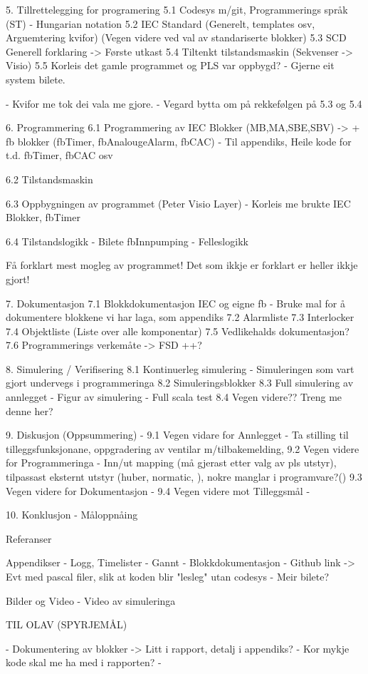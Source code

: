 5. Tillrettelegging for programering
    5.1 Codesys m/git, Programmerings språk (ST) - Hungarian notation
    5.2 IEC Standard (Generelt, templates osv, Arguemtering kvifor) (Vegen videre ved val av standariserte blokker)
    5.3 SCD Generell forklaring -> Første utkast
    5.4 Tiltenkt tilstandsmaskin (Sekvenser -> Visio)
    5.5 Korleis det gamle programmet og PLS var oppbygd?
    - Gjerne eit system bilete.
  
    - Kvifor me tok dei vala me gjore.
    - Vegard bytta om på rekkefølgen på 5.3 og 5.4


6. Programmering
    6.1 Programmering av IEC Blokker (MB,MA,SBE,SBV) -> + fb blokker (fbTimer, fbAnalougeAlarm, fbCAC)
    - Til appendiks, Heile kode for t.d. fbTimer, fbCAC osv
   
    6.2 Tilstandsmaskin

    6.3 Oppbygningen av programmet (Peter Visio Layer)
    - Korleis me brukte IEC Blokker, fbTimer

    6.4 Tilstandslogikk
    - Bilete fbInnpumping
    - Felleslogikk


    Få forklart mest mogleg av programmet!
    Det som ikkje er forklart er heller ikkje gjort!

7. Dokumentasjon
    7.1 Blokkdokumentasjon IEC og eigne fb
    - Bruke mal for å dokumentere blokkene vi har laga, som appendiks
    7.2 Alarmliste
    7.3 Interlocker
    7.4 Objektliste (Liste over alle komponentar)
    7.5 Vedlikehalds dokumentasjon? 
    7.6 Programmerings verkemåte -> FSD
    ++?


8. Simulering / Verifisering
    8.1 Kontinuerleg simulering
    - Simuleringen som vart gjort undervegs i programmeringa
    8.2 Simuleringsblokker
    8.3 Full simulering av annlegget
    - Figur av simulering
    - Full scala test
    8.4 Vegen videre?? Treng me denne her?

9. Diskusjon (Oppsummering)             - 
    9.1 Vegen vidare for Annlegget      - Ta stilling til tilleggsfunksjonane, oppgradering av ventilar m/tilbakemelding, 
    9.2 Vegen videre for Programmeringa - Inn/ut mapping (må gjerast etter valg av pls utstyr), tilpassast eksternt utstyr (huber, normatic, ), 
                                          nokre manglar i programvare?()
    9.3 Vegen videre for Dokumentasjon  - 
    9.4 Vegen videre mot Tilleggsmål    - 

10. Konklusjon 
    - Måloppnåing


Referanser

Appendikser
- Logg, Timelister
- Gannt
- Blokkdokumentasjon
- Github link -> Evt med pascal filer, slik at koden blir "lesleg" utan codesys
- Meir bilete?

Bilder og Video
- Video av simuleringa



TIL OLAV (SPYRJEMÅL)

- Dokumentering av blokker -> Litt i rapport, detalj i appendiks?
- Kor mykje kode skal me ha med i rapporten?
- 

